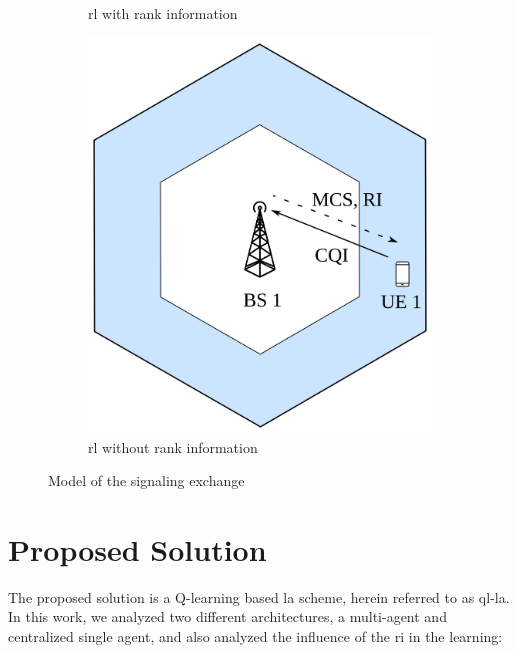 \begin{figure}
\begin{subfigure}[htb]{0.3\textwidth}
         \caption{\gls{rl} with rank information}
         \label{fig:la-system-model-2}
     \end{subfigure}
     \hfill
     \begin{subfigure}[htb]{0.3\textwidth}
         \centering
         \includegraphics[width=\textwidth]{figures/chp_la/system_model_3.png}
         \caption{\gls{rl} without rank information}
         \label{fig:la-system-model-3}
     \end{subfigure}
        \caption{Model of the signaling exchange}
        \label{fig:la-system-model}
\end{figure}




\section{Proposed Solution}
\label{sec:la-proposed}

The proposed solution is a Q-learning based \gls{la} scheme, herein referred to as \gls{ql-la}.
%
In this work, we analyzed two different architectures, a multi-agent and centralized single agent, and also analyzed the influence of the \gls{ri} in the learning:

